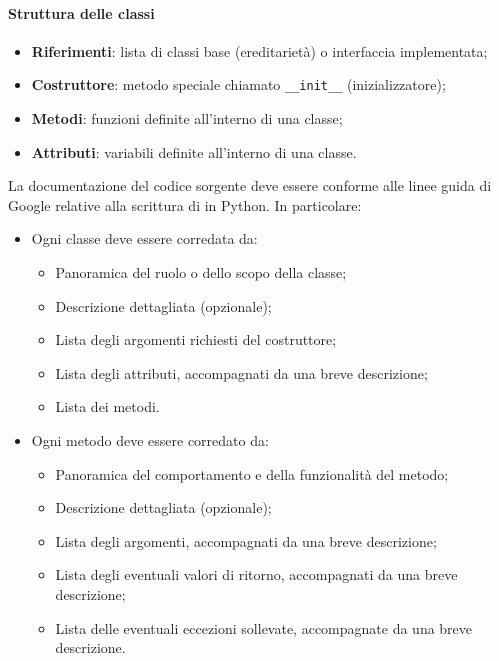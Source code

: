 \paragraph*{Struttura delle classi}
\begin{itemize}
  \item \textbf{Riferimenti}: lista di classi base (ereditarietà) o interfaccia implementata;
  \item \textbf{Costruttore}: metodo speciale chiamato \verb|__init__| (inizializzatore);
  \item \textbf{Metodi}: funzioni definite all'interno di una classe;
  \item \textbf{Attributi}: variabili definite all'interno di una classe.
\end{itemize}

\vspace{0.5\baselineskip}
\par La documentazione del codice sorgente deve essere conforme alle linee guida di Google relative alla scrittura di  in Python. In particolare:
\begin{itemize}
  \item Ogni classe deve essere corredata da:
  \begin{itemize}
    \item Panoramica del ruolo o dello scopo della classe;
    \item Descrizione dettagliata (opzionale);
    \item Lista degli argomenti richiesti del costruttore;
    \item Lista degli attributi, accompagnati da una breve descrizione; 
    \item Lista dei metodi.
  \end{itemize}
  \item Ogni metodo deve essere corredato da:
  \begin{itemize}
    \item Panoramica del comportamento e della funzionalità del metodo;
    \item Descrizione dettagliata (opzionale);
    \item Lista degli argomenti, accompagnati da una breve descrizione; 
    \item Lista degli eventuali valori di ritorno, accompagnati da una breve descrizione;
    \item Lista delle eventuali eccezioni sollevate, accompagnate da una breve descrizione.
  \end{itemize}
\end{itemize}

